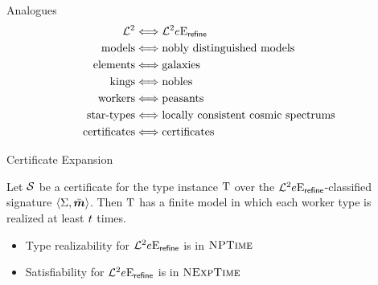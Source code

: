 \documentclass{beamer}
\begin{document}
\begin{frame}{Analogues}
\begin{align*}
  \mathcal{L}^{2} &\Longleftrightarrow \mathcal{L}^{2}{e}\mathrm{E}_{\mathsf{refine}} \\
  \text{models} &\Longleftrightarrow \text{nobly distinguished models} \\
  \text{elements} &\Longleftrightarrow \text{galaxies} \\
  \text{kings} &\Longleftrightarrow \text{nobles} \\
  \text{workers} &\Longleftrightarrow \text{peasants} \\
  \text{star-types} &\Longleftrightarrow \text{locally consistent cosmic
  spectrums} \\
  \text{certificates} &\Longleftrightarrow \text{certificates}
\end{align*}
\end{frame}

\begin{frame}{Certificate Expansion}
\begin{theorem}
Let $\mathcal{S}$ be a certificate for the type instance $\mathrm{T}$ over the
$\mathcal{L}^{2}{e}\mathrm{E}_{\mathsf{refine}}$-classified signature $\left\langle \Sigma,\bar{\bm{m}} \right\rangle$.
Then $\mathrm{T}$ has a finite model in which each worker type is realized at least
$t$ times.
\end{theorem}
\begin{itemize}
  \item Type realizability for $\mathcal{L}^{2}{e}\mathrm{E}_{\mathsf{refine}}$ is in
  $\text{\normalfont{\scshape NPTime}}$
  \item Satisfiability for $\mathcal{L}^{2}{e}\mathrm{E}_{\mathsf{refine}}$ is in
  $\text{\normalfont{\scshape NExpTime}}$
\end{itemize}
\end{frame}
\end{document}
